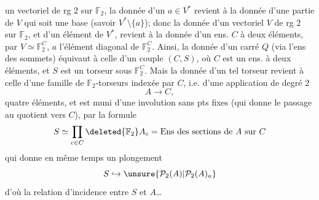 un vectoriel  de rg $2$ sur $\mathbb{F}_2$, la donnée d'un $a\in V^*$ revient à la donnée d'une partie de $V$ qui soit une base (savoir $V^*\setminus\{a\}$); donc la donnée d'un  vectoriel $V$ de rg $2$ sur $\mathbb{F}_2$, et d'un élément  de $V^*$, revient à la donnée d'un ens. $C$ à deux éléments, par $V\simeq\mathbb{F}_2^C$, $a$ l'élément diagonal de $\mathbb{F}_2^C$.
Ainsi, la donnée d'un carré $Q$  (via l'ens des sommets) équivaut à celle d'un couple $(C,S)$, où $C$  est un ens. à deux éléments, et $S$ est un torseur sous $\mathbb{F}_2^C$. Mais la donnée d'un tel torseur revient à celle d'une famille de $\mathbb{F}_2$-torseurs indexée par $C$, i.e. d'une application de degré $2$
\[
A\longrightarrow C,
\]
 quatre éléments, et est muni d'une involution sans pts fixes (qui donne le passage au quotient vers $C$), par la formule
\[
S\simeq\prod_{c\in C}\deleted{\mathbb{F}_2}A_c
=\text{Ens des sections de $A$ sur $C$}
\]
qui donne en même temps un plongement
\[
S\hookrightarrow\unsure{\mathcal{P}_2(A)|\mathcal{P}_2(A)_a}
\]
d'où la relation d'incidence entre $S$ et $A$\ldots
{}
